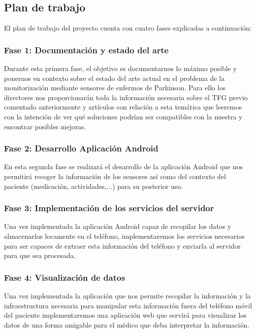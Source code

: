 \documentclass[11pt,spanish]{article}
\begin{document}
\subsection{Plan de trabajo}
El plan de trabajo del proyecto cuenta con cuatro fases explicadas a continuación:

\subsubsection{Fase 1: Documentación y estado del arte}
Durante esta primera fase, el objetivo es documentarnos lo máximo posible y ponernos en contexto sobre el estado del arte actual en el problema de la monitorización mediante sensores de enfermos de Parkinson. Para ello los directores nos proporcionarán toda la información necesaria sobre el TFG previo comentado anteriormente y artículos con relación a esta temática que leeremos con la intención de ver qué soluciones podrían ser compatibles con la nuestra y encontrar posibles mejoras.

\subsubsection{Fase 2: Desarrollo Aplicación Android}
En esta segunda fase se realizará el desarrollo de la aplicación Android que nos permitirá recoger la información de los sensores así como del contexto del paciente (medicación, actividades,...) para su posterior uso.

\subsubsection{Fase 3: Implementación de los servicios del servidor}
Una vez implementada la aplicación Android capaz de recopilar los datos y almacenarlos locamente en el teléfono, implementaremos los servicios necesarios para ser capaces de extraer esta información del teléfono y enviarla al servidor para que sea procesada.

\subsubsection{Fase 4: Visualización de datos}
Una vez implementada la aplicación que nos permite recopilar la información y la infraestructura necesaria para manipular esta información fuera del teléfono móvil del paciente implementaremos una aplicación web que servirá para visualizar los datos de una forma amigable para el médico que deba interpretar la información.
\newpage
\end{document}

